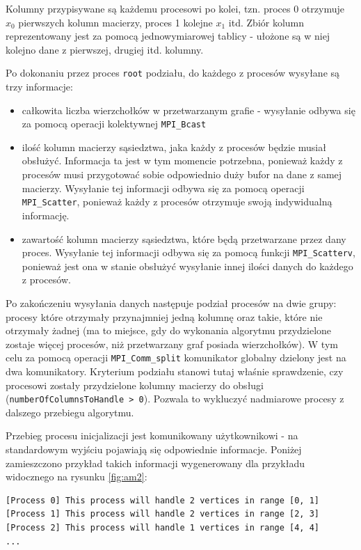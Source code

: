 \documentclass[12pt]{article}
\begin{document}
Kolumny przypisywane są każdemu procesowi po kolei, tzn. proces 0 otrzymuje $x_0$ pierwszych kolumn macierzy, proces 1 kolejne $x_1$ itd. Zbiór kolumn reprezentowany jest za pomocą jednowymiarowej tablicy - ułożone są w niej kolejno dane z pierwszej, drugiej itd. kolumny.

Po dokonaniu przez proces \lstinline{root} podziału, do każdego z procesów wysyłane są trzy informacje:
\begin{itemize}
\item całkowita liczba wierzchołków w przetwarzanym grafie - wysyłanie odbywa się za pomocą operacji kolektywnej \lstinline{MPI_Bcast}
\item ilość kolumn macierzy sąsiedztwa, jaka każdy z procesów będzie musiał obsłużyć. Informacja ta jest w tym momencie potrzebna, ponieważ każdy z procesów musi przygotować sobie odpowiednio duży bufor na dane z samej macierzy. Wysyłanie tej informacji odbywa się za pomocą operacji \lstinline{MPI_Scatter}, ponieważ każdy z procesów otrzymuje swoją indywidualną informację.
\item zawartość kolumn macierzy sąsiedztwa, które będą przetwarzane przez dany proces. Wysyłanie tej informacji odbywa się za pomocą funkcji \lstinline{MPI_Scatterv}, ponieważ jest ona w stanie obsłużyć wysyłanie innej ilości danych do każdego z procesów.
\end{itemize}

Po zakończeniu wysyłania danych następuje podział procesów na dwie grupy: procesy które otrzymały przynajmniej jedną kolumnę oraz takie, które nie otrzymały żadnej (ma to miejsce, gdy do wykonania algorytmu przydzielone zostaje więcej procesów, niż przetwarzany graf posiada wierzchołków). W tym celu za pomocą operacji \lstinline{MPI_Comm_split} komunikator globalny dzielony jest na dwa komunikatory. Kryterium podziału stanowi tutaj właśnie sprawdzenie, czy procesowi zostały przydzielone kolumny macierzy do obsługi (\lstinline{numberOfColumnsToHandle > 0}). Pozwala to wykluczyć nadmiarowe procesy z dalszego przebiegu algorytmu.

Przebieg procesu inicjalizacji jest komunikowany użytkownikowi - na standardowym wyjściu pojawiają się odpowiednie informacje. Poniżej zamieszczono przykład takich informacji wygenerowany dla przykładu widocznego na rysunku \ref{fig:am2}:

\begin{lstlisting}
[Process 0] This process will handle 2 vertices in range [0, 1]
[Process 1] This process will handle 2 vertices in range [2, 3]
[Process 2] This process will handle 1 vertices in range [4, 4]
...
\end{lstlisting}
\end{document}
